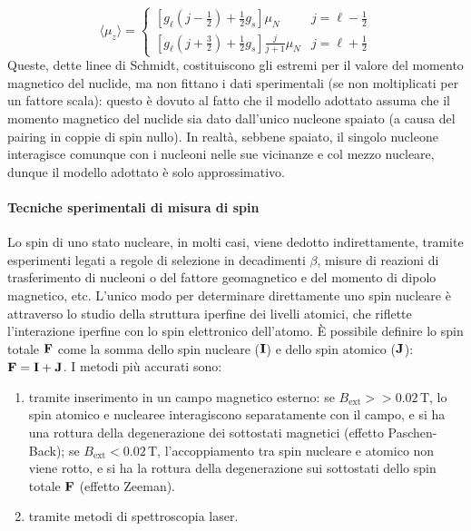 \begin{equation}
	\langle \mu_z \rangle =
	\begin{cases}
		\left[ g_{\ell} \left( j - \frac{1}{2} \right) + \frac{1}{2} g_s \right] \mu_N & j = \ell - \frac{1}{2} \\
		\left[ g_{\ell} \left( j + \frac{3}{2} \right) + \frac{1}{2} g_s \right] \frac{j}{j + 1} \mu_N & j = \ell + \frac{1}{2}
	\end{cases}
	\label{eq:1.41}
\end{equation}
Queste, dette linee di Schmidt, costituiscono gli estremi per il valore del momento magnetico del nuclide, ma non fittano i dati sperimentali (se non moltiplicati per un fattore scala): questo è dovuto al fatto che il modello adottato assuma che il momento magnetico del nuclide sia dato dall'unico nucleone spaiato (a causa del pairing in coppie di spin nullo). In realtà, sebbene spaiato, il singolo nucleone interagisce comunque con i nucleoni nelle sue vicinanze e col mezzo nucleare, dunque il modello adottato è solo approssimativo.

\paragraph{Tecniche sperimentali di misura di spin} 
Lo spin di uno stato nucleare, in molti casi, viene dedotto indirettamente, tramite esperimenti legati a regole di selezione in decadimenti $\beta$, misure di reazioni di trasferimento di nucleoni o del fattore geomagnetico e del momento di dipolo magnetico, etc. L'unico modo per determinare direttamente uno spin nucleare è attraverso lo studio della struttura iperfine dei livelli atomici, che riflette l'interazione iperfine con lo spin elettronico dell'atomo. È possibile definire lo spin totale $\mathbf{F}$ come la somma dello spin nucleare ($\mathbf{I}$) e dello spin atomico ($\mathbf{J}$): $\mathbf{F}= \mathbf{I} + \mathbf{J}$. I metodi più accurati sono:
\begin{enumerate}
	\item tramite inserimento in un campo magnetico esterno: se $B_{\text{ext}} >> 0.02 \, \text{T}$, lo spin atomico e nuclearee interagiscono separatamente con il campo, e si ha una rottura della degenerazione dei sottostati magnetici (effetto Paschen-Back); se $B_\text{{ext}} < 0.02 \, \text{T}$, l'accoppiamento tra spin nucleare e atomico non viene rotto, e si ha la rottura della degenerazione sui sottostati dello spin totale $\mathbf{F}$ (effetto Zeeman).
	\item tramite metodi di spettroscopia laser.
  \end{enumerate}

